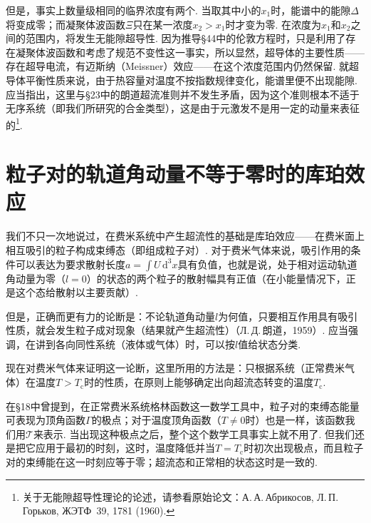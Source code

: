 但是，事实上数量级相同的临界浓度有两个. 当取其中小的$x_1$时，能谱中的能隙$\Delta$将变成零；而凝聚体波函数$\Xi$只在某一浓度$x_2>x_1$时才变为零. 在浓度为$x_1$和$x_2$之间的范围内，将发生无能隙超导性. 因为推导§44中的伦敦方程时，只是利用了存在凝聚体波函数和考虑了规范不变性这一事实，所以显然，超导体的主要性质——存在超导电流，有迈斯纳（Meissner）效应——在这个浓度范围内仍然保留. 就超导体平衡性质来说，由于热容量对温度不按指数规律变化，能谱里便不出现能隙. 应当指出，这里与§23中的朗道超流准则并不发生矛盾，因为这个准则根本不适于无序系统（即我们所研究的合金类型），这是由于元激发不是用一定的动量来表征的\footnote{关于无能隙超导性理论的论述，请参看原始论文：А.\,А.\,Абрикосов, Л.\,П.\,Горьков, ЖЭТФ~39, 1781 (1960).}.

\section{粒子对的轨道角动量不等于零时的库珀效应}

我们不只一次地说过，在费米系统中产生超流性的基础是库珀效应——在费米面上相互吸引的粒子构成束缚态（即组成粒子对）. 对于费米气体来说，吸引作用的条件可以表达为要求散射长度$a=\int U\,\mathrm{d}^3x$具有负值，也就是说，处于相对运动轨道角动量为零（$l=0$）的状态的两个粒子的散射幅具有正值（在小能量情况下，正是这个态给散射以主要贡献）.

但是，正确而更有力的论断是：不论轨道角动量$l$为何值，只要相互作用具有吸引性质，就会发生粒子成对现象（结果就产生超流性）（Л.\,Д.\,朗道，1959）. 应当强调，在讲到各向同性系统（液体或气体）时，可以按$l$值给状态分类.

现在对费米气体来证明这一论断，这里所用的方法是：只根据系统（正常费米气体）在温度$T>T_{\mathrm{c}}$时的性质，在原则上能够确定出向超流态转变的温度$T_{\mathrm{c}}$.

在§18中曾提到，在正常费米系统格林函数这一数学工具中，粒子对的束缚态能量可表现为顶角函数$\Gamma$的极点；对于温度顶角函数（$T\neq0$时）也是一样，该函数我们用$\mathcal{T}$来表示. 当出现这种极点之后，整个这个数学工具事实上就不用了. 但我们还是把它应用于最初的时刻，这时，温度降低并当$T=T_{\mathrm{c}}$时初次出现极点，而且粒子对的束缚能在这一时刻应等于零；超流态和正常相的状态这时是一致的.


